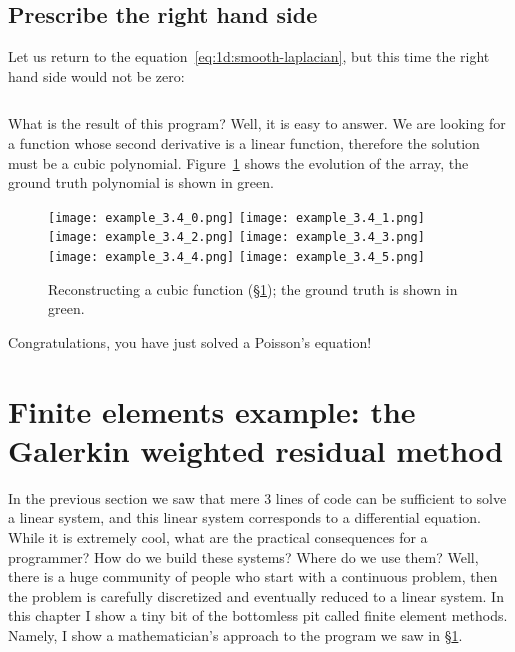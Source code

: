 \documentclass[notitlepage,oneside]{book}
\makeatletter
\newcommand{\authoredby}[1]{\addtocontents{toc}{\protect\@nameuse{authoredby#1}}}%
\makeatother
\begin{document}
\section{Prescribe the right hand side}
\label{sec:rhs}

Let us return to the equation~\eqref{eq:1d:smooth-laplacian}, but this time the right hand side would not be zero:
\inputminted[frame=single,linenos=true]{python}{listings/example_3.4.py}
What is the result of this program? Well, it is easy to answer. We are looking for a function whose second derivative is a linear function,
therefore the solution must be a cubic polynomial. Figure~\ref{fig:linsys-cubic} shows the evolution of the array, the ground truth polynomial is shown in green.

\begin{figure}[ht]
    \centering
    \texttt{[image: example\_3.4\_0.png]}
    \texttt{[image: example\_3.4\_1.png]}
    \texttt{[image: example\_3.4\_2.png]}
    \texttt{[image: example\_3.4\_3.png]}
    \texttt{[image: example\_3.4\_4.png]}
    \texttt{[image: example\_3.4\_5.png]}
    \caption{Reconstructing a cubic function (\S\ref{sec:rhs}); the ground truth is shown in green.}
    \label{fig:linsys-cubic}
\end{figure}

Congratulations, you have just solved a Poisson's equation!




\authoredby{A}
\chapter{Finite elements example: the Galerkin weighted residual method}
\fancyhead[R]{\textcolor{red}{optional for reading}}

In the previous section we saw that mere 3 lines of code can be sufficient to solve a linear system, and this linear system corresponds to a differential equation.
While it is extremely cool, what are the practical consequences for a programmer?  How do we build these systems? Where do we use them?
Well, there is a huge community of people who start with a continuous problem, then the problem is carefully discretized and eventually reduced to a linear system.
In this chapter I show a tiny bit of the bottomless pit called finite element methods.
Namely, I show a mathematician's approach to the program we saw in \S\ref{sec:rhs}.
\end{document}
